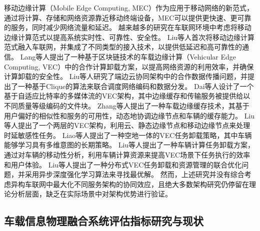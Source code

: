 移动边缘计算（Mobile Edge Computing, MEC）\cite{mao2017a}作为应用于移动网络的新范式，通过将计算、存储和网络资源靠近移动终端设备，MEC可以提供更快速、更可靠的服务，同时减少网络流量和延迟。
越来越多的研究在车联网环境中考虑将移动边缘计算范式以提高系统实时性、可靠性、安全性。
Liu等人\cite{liu2017a}首次将移动边缘计算范式融入车联网，并集成了不同类型的接入技术，以提供低延迟和高可靠性的通信。
Lang等人\cite{lang2022cooperative}提出了一种基于区块链技术的车载边缘计算（Vehicular Edge Computing, VEC）中的合作计算卸载方案，以提高网络资源的利用效率，并确保计算卸载的安全性。
Liu等人\cite{liu2021fog}研究了端边云协同架构中的合作数据传播问题，并提出了一种基于Clique的算法来联合调度网络编码和数据分发。
Dai等人\cite{dai2021edge}设计了一个基于自适应比特率的多媒体流的VEC架构，其中边缘缓存和传输服务被提供给以不同质量等级编码的文件块。
Zhang等人\cite{zhang2022digital}提出了一种车载边缘缓存技术，其基于用户偏好的相似性和服务的可用性，动态地协调边缘节点和车辆的缓存能力。
Liu等人\cite{liu2020adaptive}提出了一个两层的VEC架构，利用云、静态边缘节点和移动边缘节点来处理时延敏感性任务。
Liao等人\cite{liao2021learning}提出了一种空地一体的VEC任务卸载策略，其中车辆能够学习具有多维意图的长期策略。
Liu等人\cite{liu2023mobility}提出了一种车辆计算任务卸载方案，通过对车辆的移动性分析，利用车辆计算资源来提高VEC场景下任务执行的效率和用户体验。
Liu等人\cite{liu2023asynchronous}提出了一种分布式VEC任务卸载和资源管理的联合优化问题，并采用异步深度强化学习算法来寻找最优解。
然而，上述研究并没有综合考虑异构车联网中最大化不同服务架构的协同效应，且绝大多数架构研究仍停留在理论分析层面，缺乏在实际场景中对架构优势进行验证。

\subsection{车载信息物理融合系统评估指标研究与现状}

